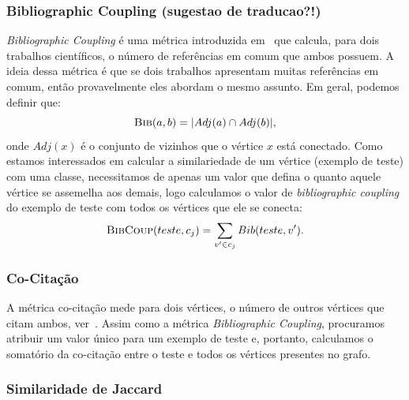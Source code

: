 \subsubsection{Bibliographic Coupling (sugestao de traducao?!)}
\label{subsubsection::bibcoup}
\textit{Bibliographic Coupling} é uma métrica introduzida em~\cite{Kessler63} que calcula, para dois trabalhos científicos, o número de referências em comum que ambos possuem. A ideia dessa métrica é que se dois trabalhos apresentam muitas referências em comum, então provavelmente eles abordam o mesmo assunto. Em geral, podemos definir que:
\begin{equation}
\textsc{Bib}(a, b) =  |Adj(a) \cap Adj(b)|,
\end{equation}
onde $Adj(x)$ é o conjunto de vizinhos que o vértice $x$ está conectado. Como estamos interessados em calcular a similariedade de um vértice (exemplo de teste) com uma classe, necessitamos de apenas um valor que defina o quanto aquele vértice se assemelha aos demais, logo calculamos o valor de \textit{bibliographic coupling} do exemplo de teste com todos os vértices que ele se conecta:
\begin{equation}
\textsc{BibCoup}(teste, c_j) =  \sum\limits_{v' \in c_j} Bib(teste, v').
\end{equation}

\subsubsection{Co-Citação}
\label{subsubsection::cocitation}
A métrica co-citação mede para dois vértices, o número de outros vértices que citam ambos, ver~\cite{Small73}. Assim como a métrica \textit{Bibliographic Coupling}, procuramos atribuir um valor único para um exemplo de teste e, portanto, calculamos o somatório da co-citação entre o teste e todos os vértices presentes no grafo.

\subsubsection{Similaridade de Jaccard}
\label{subsubsection::jaccard}

